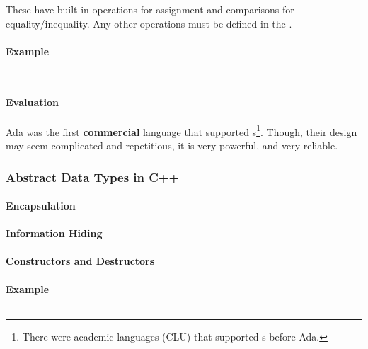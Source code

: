 These have built-in operations for assignment and comparisons for equality/inequality.
Any other operations must be defined in the .

\paragraph{Example}\label{par:Ada_Abstract_Data_Type_Example}
\inputminted[frame=lines,linenos]{ada}{./EDAP05-Concepts_Programming_Languages-Sections/Abstract_Data_Types/Code/Class_Example-Stack-Ada-Package.ada}
\inputminted[frame=lines,linenos]{ada}{./EDAP05-Concepts_Programming_Languages-Sections/Abstract_Data_Types/Code/Class_Example-Stack-Ada.ada}

\paragraph{Evaluation}\label{par:Ada_Abstract_Data_Type_Evaluation}
Ada was the first \textbf{commercial} language that supported s\footnote{There were academic languages (CLU) that supported s before Ada.}.
Though, their design may seem complicated and repetitious, it is very powerful, and very reliable.

\subsubsection{Abstract Data Types in C++}\label{subsubsec:Abstract_Data_Types_C++}
\paragraph{Encapsulation}\label{par:C++_Encapsulation}
\paragraph{Information Hiding}\label{par:C++_Info_Hiding}
\paragraph{Constructors and Destructors}\label{par:C++_Constructors_Destructors}
\paragraph{Example}\label{par:C++_Abstract_Data_Type_Example}
\inputminted[frame=lines,linenos]{c++}{./EDAP05-Concepts_Programming_Languages-Sections/Abstract_Data_Types/Code/Class_Example-Stack-CPP.cpp}

